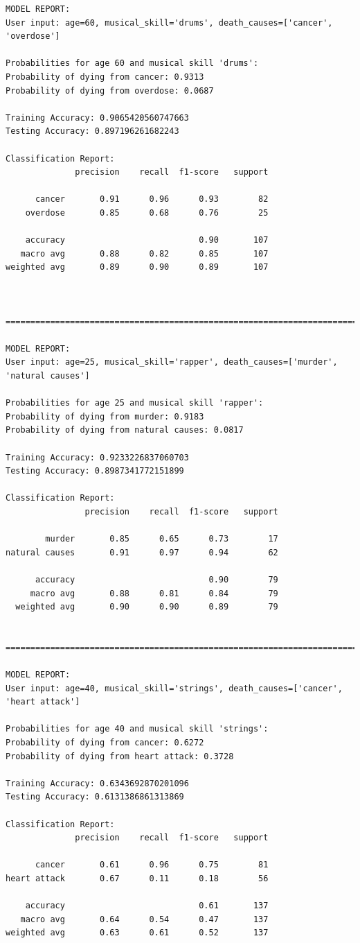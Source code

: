 \documentclass{article}
\begin{document}
\begin{verbatim}
MODEL REPORT:
User input: age=60, musical_skill='drums', death_causes=['cancer', 'overdose']

Probabilities for age 60 and musical skill 'drums':
Probability of dying from cancer: 0.9313
Probability of dying from overdose: 0.0687

Training Accuracy: 0.9065420560747663
Testing Accuracy: 0.897196261682243

Classification Report:
              precision    recall  f1-score   support

      cancer       0.91      0.96      0.93        82
    overdose       0.85      0.68      0.76        25

    accuracy                           0.90       107
   macro avg       0.88      0.82      0.85       107
weighted avg       0.89      0.90      0.89       107



==============================================================================

MODEL REPORT:
User input: age=25, musical_skill='rapper', death_causes=['murder', 'natural causes']

Probabilities for age 25 and musical skill 'rapper':
Probability of dying from murder: 0.9183
Probability of dying from natural causes: 0.0817

Training Accuracy: 0.9233226837060703
Testing Accuracy: 0.8987341772151899

Classification Report:
                precision    recall  f1-score   support

        murder       0.85      0.65      0.73        17
natural causes       0.91      0.97      0.94        62

      accuracy                           0.90        79
     macro avg       0.88      0.81      0.84        79
  weighted avg       0.90      0.90      0.89        79


==============================================================================

MODEL REPORT:
User input: age=40, musical_skill='strings', death_causes=['cancer', 'heart attack']

Probabilities for age 40 and musical skill 'strings':
Probability of dying from cancer: 0.6272
Probability of dying from heart attack: 0.3728

Training Accuracy: 0.6343692870201096
Testing Accuracy: 0.6131386861313869

Classification Report:
              precision    recall  f1-score   support

      cancer       0.61      0.96      0.75        81
heart attack       0.67      0.11      0.18        56

    accuracy                           0.61       137
   macro avg       0.64      0.54      0.47       137
weighted avg       0.63      0.61      0.52       137

\end{verbatim}
\end{document}
